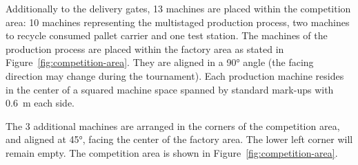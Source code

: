 \documentclass[12pt,twoside]{article}
\begin{document}
Additionally to the delivery gates, 13 machines are placed within the
competition area: 10 machines representing the multistaged production
process, two machines to recycle consumed pallet carrier and one test
station. The machines of the production process are placed within the
factory area as stated in Figure~\ref{fig:competition-area}. They are
aligned in a \ang{90} angle (the facing direction may change during
the tournament). Each production machine resides in the center of a
squared machine space spanned by standard mark-ups with
\SI{0.6}{\metre} each side.

The 3 additional machines are arranged in the corners of the
competition area, and aligned at \ang{45}, facing the center of the
factory area. The lower left corner will remain empty. The competition
area is shown in Figure~\ref{fig:competition-area}.
\end{document}
